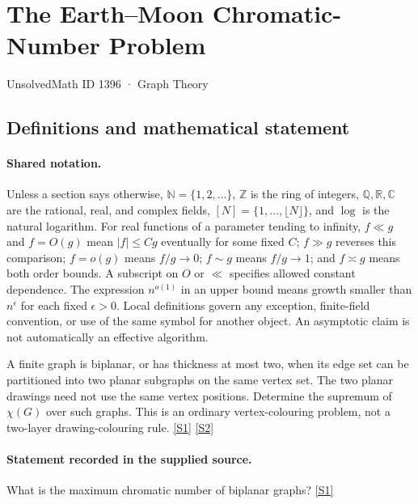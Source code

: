 \documentclass[11pt,a4paper]{article}
\newcommand{\N}{\mathbb{N}}
\newcommand{\Z}{\mathbb{Z}}
\newcommand{\Q}{\mathbb{Q}}
\newcommand{\R}{\mathbb{R}}
\newcommand{\C}{\mathbb{C}}
\newcommand{\sref}[2]{\hyperlink{source:#1:#2}{[S#2]}}
\begin{document}

\setcounter{section}{1395}

\section{The Earth--Moon Chromatic-Number Problem}\label{1396}

{\small\sffamily UnsolvedMath ID 1396 · Graph Theory}

\subsection{Definitions and mathematical statement}

\paragraph{Shared notation.}Unless a section says otherwise, $\N=\{1,2,\ldots\}$,
$\Z$ is the ring of integers, $\Q,\R,\C$ are the rational, real, and complex
fields, $[N]=\{1,\ldots,\lfloor N\rfloor\}$, and $\log$ is the natural
logarithm. For real functions of a parameter tending to infinity,
$f\ll g$ and $f=O(g)$ mean $|f|\leq Cg$ eventually for some fixed $C$;
$f\gg g$ reverses this comparison; $f=o(g)$ means $f/g\to0$;
$f\sim g$ means $f/g\to1$; and $f\asymp g$ means both order bounds.
A subscript on $O$ or $\ll$ specifies allowed constant dependence.
The expression $n^{o(1)}$ in an upper bound means growth smaller than
$n^\epsilon$ for each fixed $\epsilon>0$. Local definitions govern any
exception, finite-field convention, or use of the same symbol for another
object. An asymptotic claim is not automatically an effective algorithm.



A finite graph is biplanar, or has thickness at most two, when its edge set can be partitioned into two planar subgraphs on the same vertex set. The two planar drawings need not use the same vertex positions. Determine the supremum of $\chi(G)$ over such graphs. This is an ordinary vertex-colouring problem, not a two-layer drawing-colouring rule. \sref{1396}{1} \sref{1396}{2}

\paragraph{Statement recorded in the supplied source.}
What is the maximum chromatic number of biplanar graphs? \sref{1396}{1}
\end{document}
